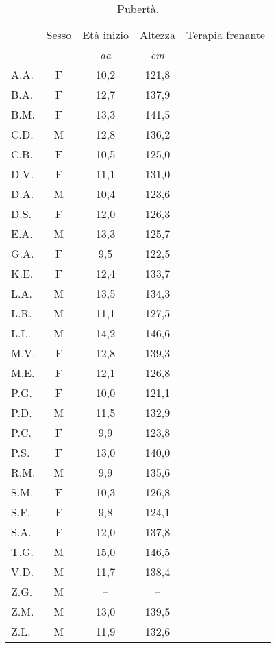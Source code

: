 \begin{table}[!h]
\begin{center}
\begin{tabular}{lcccc}
\toprule
 & Sesso 	& \multicolumn{1}{c}{Età inizio}	& Altezza	& Terapia frenante \\
 & &  \multicolumn{1}{c}{\emph{aa}} 	& \multicolumn{1}{c}{\emph{cm}}			\\
\midrule
A.A.	& F & 10,2 		& 121,8  		& \checkmark \\
B.A.	& F & 12,7 		& 137,9   		&            \\
B.M.	& F & 13,3 		& 141,5   		&            \\
C.D.	& M & 12,8 		& 136,2   		&            \\
C.B.	& F & 10,5 		& 125,0   		& \checkmark \\
D.V.	& F & 11,1 		& 131,0   		&            \\
D.A.	& M & 10,4 		& 123,6   		& \checkmark \\
D.S.	& F & 12,0 		& 126,3   		&            \\
E.A.	& M & 13,3		& 125,7   		&            \\
G.A.	& F &  9,5  	& 122,5   		&            \\
K.E.	& F & 12,4    	&133,7    		&            \\
L.A.	& M & 13,5 		& 134,3   		&            \\
L.R.	& M & 11,1 		& 127,5   		&            \\
L.L.	& M & 14,2 		& 146,6   		&            \\
M.V.	& F & 12,8 		& 139,3   		&            \\
M.E.	& F & 12,1 		& 126,8   		&            \\
P.G.	& F & 10,0 		& 121,1   		& \checkmark \\
P.D.	& M & 11,5 		& 132,9   		&            \\
P.C.	& F &  9,9  		& 123,8   		& \checkmark \\
P.S.	& F & 13,0 		& 140,0   		&            \\
R.M.	& M &  9,9  		& 135,6   		& \checkmark \\
S.M.	& F & 10,3 		& 126,8   		& \checkmark \\
S.F.	& F &  9,8  		& 124,1   		&            \\
S.A.	& F & 12,0 		& 137,8   		&            \\
T.G.    & M & 15,0      & 146,5         &            \\ 
V.D.	& M & 11,7 		& 138,4   		&            \\
Z.G.	& M &  --    		& --   		&            \\
Z.M.	& M & 13,0 		& 139,5   		&            \\
Z.L.	& M & 11,9 		& 132,6   		&            \\
\bottomrule
\end{tabular}
\end{center}
\caption{Pubertà.}
\label{tab:Puberta}
\end{table}


